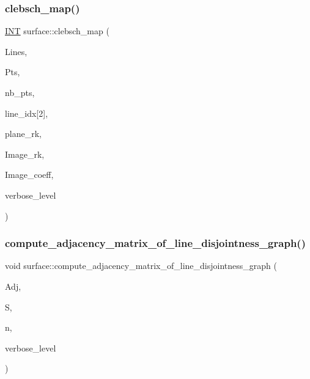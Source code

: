 \subsubsection{\texorpdfstring{clebsch\+\_\+map()}{clebsch\_map()}}
{\footnotesize\ttfamily \mbox{\hyperlink{galois_8h_a09fddde158a3a20bd2dcadb609de11dc}{I\+NT}} surface\+::clebsch\+\_\+map (\begin{DoxyParamCaption}\item[{\mbox{\hyperlink{galois_8h_a09fddde158a3a20bd2dcadb609de11dc}{I\+NT}} $\ast$}]{Lines,  }\item[{\mbox{\hyperlink{galois_8h_a09fddde158a3a20bd2dcadb609de11dc}{I\+NT}} $\ast$}]{Pts,  }\item[{\mbox{\hyperlink{galois_8h_a09fddde158a3a20bd2dcadb609de11dc}{I\+NT}}}]{nb\+\_\+pts,  }\item[{\mbox{\hyperlink{galois_8h_a09fddde158a3a20bd2dcadb609de11dc}{I\+NT}}}]{line\+\_\+idx\mbox{[}2\mbox{]},  }\item[{\mbox{\hyperlink{galois_8h_a09fddde158a3a20bd2dcadb609de11dc}{I\+NT}}}]{plane\+\_\+rk,  }\item[{\mbox{\hyperlink{galois_8h_a09fddde158a3a20bd2dcadb609de11dc}{I\+NT}} $\ast$}]{Image\+\_\+rk,  }\item[{\mbox{\hyperlink{galois_8h_a09fddde158a3a20bd2dcadb609de11dc}{I\+NT}} $\ast$}]{Image\+\_\+coeff,  }\item[{\mbox{\hyperlink{galois_8h_a09fddde158a3a20bd2dcadb609de11dc}{I\+NT}}}]{verbose\+\_\+level }\end{DoxyParamCaption})}

\mbox{\label{classsurface_ae647f9893e4d2161281845529e7bb0f5}} 
\subsubsection{\texorpdfstring{compute\+\_\+adjacency\+\_\+matrix\+\_\+of\+\_\+line\+\_\+disjointness\+\_\+graph()}{compute\_adjacency\_matrix\_of\_line\_disjointness\_graph()}}
{\footnotesize\ttfamily void surface\+::compute\+\_\+adjacency\+\_\+matrix\+\_\+of\+\_\+line\+\_\+disjointness\+\_\+graph (\begin{DoxyParamCaption}\item[{\mbox{\hyperlink{galois_8h_a09fddde158a3a20bd2dcadb609de11dc}{I\+NT}} $\ast$\&}]{Adj,  }\item[{\mbox{\hyperlink{galois_8h_a09fddde158a3a20bd2dcadb609de11dc}{I\+NT}} $\ast$}]{S,  }\item[{\mbox{\hyperlink{galois_8h_a09fddde158a3a20bd2dcadb609de11dc}{I\+NT}}}]{n,  }\item[{\mbox{\hyperlink{galois_8h_a09fddde158a3a20bd2dcadb609de11dc}{I\+NT}}}]{verbose\+\_\+level }\end{DoxyParamCaption})}


